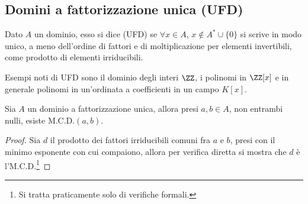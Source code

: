 \documentclass[11pt]{scrartcl}
\begin{document}
\newpage
\subsection{Domini a fattorizzazione unica (UFD)}
\begin{definition}
    Dato $A$ un dominio, esso si dice  (UFD) se $\forall x \in A$, $x \not\in A^* \cup \{0\}$ si scrive in modo
    unico, a meno dell'ordine di fattori e di moltiplicazione per elementi invertibili, come prodotto di elementi irriducibili.
\end{definition}

\begin{example}
    Esempi noti di UFD sono il dominio degli interi $\ZZ$, i polinomi in $\ZZ[x]$ e in generale polinomi in un'ordinata a coefficienti in un campo $K[x]$.
\end{example}

\begin{proposition}
    Sia $A$ un dominio a fattorizzazione unica, allora presi $a,b \in A$, non entrambi nulli, esiste $\text{M.C.D.}(a,b)$.
\end{proposition}

\begin{proof}
    Sia $d$ il prodotto dei fattori irriducibili comuni fra $a$ e $b$, presi con il minimo esponente con cui compaiono,
    allora per verifica diretta si mostra che $d$ è l'M.C.D.\footnote{Si tratta praticamente solo di verifiche formali.}
\end{proof}
\end{document}
